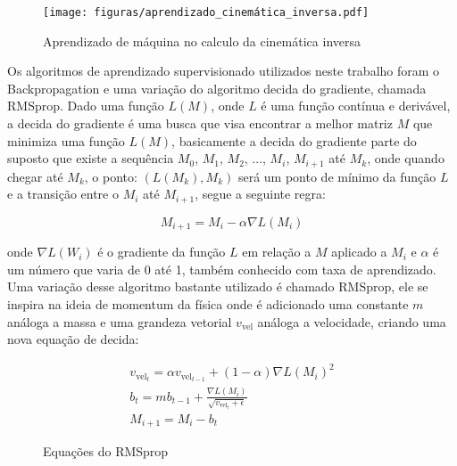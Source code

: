 \begin{figure}[H]
    \centering
    \texttt{[image: figuras/aprendizado\_cinemática\_inversa.pdf]}
    \caption{Aprendizado de máquina no calculo da cinemática inversa}
\end{figure}

Os algoritmos de aprendizado supervisionado utilizados neste trabalho
foram o Backpropagation e uma variação do algoritmo decida do gradiente, chamada
RMSprop.
Dado uma função $L(M)$, onde $L$ é uma função contínua e derivável,
a decida do gradiente é uma busca que visa encontrar
a melhor matriz $M$ que minimiza uma função $L(M)$, basicamente a
decida do gradiente parte do suposto que existe a sequência
$M_0$, $M_1$, $M_2$, ..., $M_i$, $M_{i+1}$ até $M_k$, onde quando
chegar até $M_k$, o ponto: $(L(M_k),M_k)$ será um ponto de mínimo da função $L$ e a transição
entre o $M_{i}$ até $M_{i+1}$, segue a seguinte regra:

\begin{equation}
    M_{i+1} = M_i -\alpha \nabla L(M_i)
\end{equation}

onde $\nabla L(W_i)$ é o gradiente da função $L$ em relação a $M$ aplicado
a $M_i$ e $\alpha$ é um número que varia de 0 até 1,
também conhecido com taxa de aprendizado. Uma variação desse algoritmo
bastante utilizado é chamado RMSprop, ele se inspira na ideia de momentum
da física  onde  é adicionado uma constante $m$ análoga a massa e uma grandeza
vetorial $v_{\text{vel}}$ análoga a velocidade, criando uma nova equação de decida:

\begin{figure}[H]
    \begin{align*}
        v_{\text{vel}_t} = \alpha v_{\text{vel}_{t-1}} + (1 - \alpha)\nabla L(M_i)^2 \\
        b_t = mb_{t-1} + \frac{\nabla L(M_i)}{\sqrt{v_{\text{vel}_t} + \epsilon}} \\
        M_{i+1} = M_i - b_t
    \end{align*}
    \caption{Equações do RMSprop}
\end{figure}

